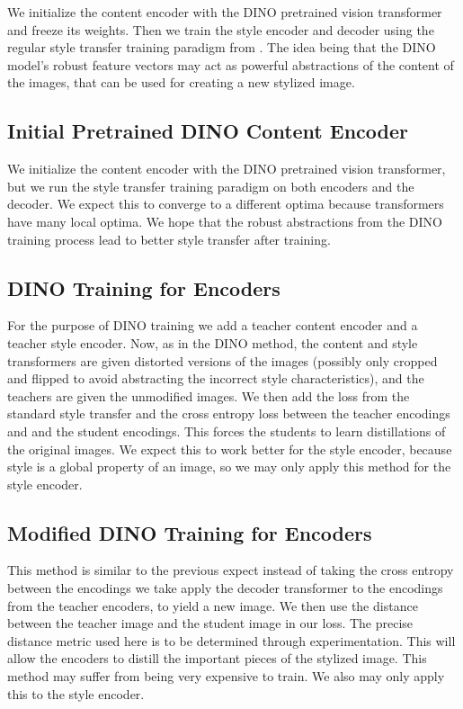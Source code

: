 \documentclass{article}
\begin{document}
We initialize the content encoder with the DINO pretrained vision transformer and freeze its weights. Then we train the style encoder and decoder using the regular style transfer training paradigm from \cite{ImageStyleTransformer}. The idea being that the DINO model's robust feature vectors may act as powerful abstractions of the content of the images, that can be used for creating a new stylized image.

\subsection{Initial Pretrained DINO Content Encoder}

We initialize the content encoder with the DINO pretrained vision transformer, but we run the style transfer training paradigm on both encoders and the decoder. We expect this to converge to a different optima because transformers have many local optima. We hope that the robust abstractions from the DINO training process lead to better style transfer after training.

\subsection{DINO Training for Encoders}

For the purpose of DINO training we add a teacher content encoder and a teacher style encoder. Now, as in the DINO method, the content and style transformers are given distorted versions of the images (possibly only cropped and flipped to avoid abstracting the incorrect style characteristics), and the teachers are given the unmodified images. We then add the loss from the standard style transfer and the cross entropy loss between the teacher encodings and and the student encodings. This forces the students to learn distillations of the original images. We expect this to work better for the style encoder, because style is a global property of an image, so we may only apply this method for the style encoder.

\subsection{Modified DINO Training for Encoders}

This method is similar to the previous expect instead of taking the cross entropy between the encodings we take apply the decoder transformer to the encodings from the teacher encoders, to yield a new image. We then use the distance between the teacher image and the student image in our loss. The precise distance metric used here is to be determined through experimentation. This will allow the encoders to distill the important pieces of the stylized image. This method may suffer from being very expensive to train. We also may only apply this to the style encoder.

\medskip

\nocite{*}


\end{document}
